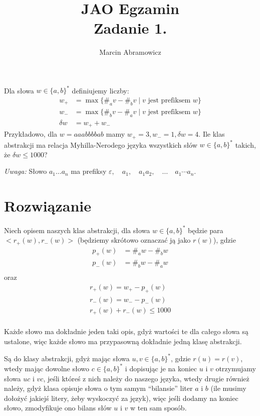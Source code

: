 \documentclass[a4paper]{article}
\title{JAO Egzamin\\ Zadanie 1.}
\author{Marcin Abramowicz}
\newcommand{\eps}{\varepsilon}%
\newcommand{\set}[1]{\{#1\}}%
\begin{document}
\maketitle

Dla słowa $w\in \set{a,b}^*$ definiujemy liczby:
\begin{align*}
    w_+&=\max \set{\#_av-\#_bv\mid v \text{ jest prefiksem }w}\\
    w_-&=\max \set{\#_bv-\#_av\mid v \text{ jest prefiksem }w}\\
    \delta w&=w_++w_-
\end{align*}
Przykładowo, dla $w=aaabbbbab$
mamy $w_+=3, w_-=1, \delta w=4$.
Ile klas abstrakcji ma relacja Myhilla-Nerodego języka wszystkich słów $w\in\set{a,b}^*$ takich, że $\delta w\leq 1000$?

\medskip\noindent
\emph{Uwaga:} Słowo $a_1\ldots a_n$ ma prefiksy $\eps,\quad a_1,\quad a_1a_2,\quad\ldots\quad a_1\cdots a_n$.


\section*{Rozwiązanie}
Niech opisem naszych klas abstrakcji, dla słowa $w \in \set{a, b}^*$ będzie para $<r_+(w), r_-(w)>$ (będziemy skrótowo oznaczać ją jako $r(w)$), gdzie 
\begin{align*}
    p_+(w)&=\#_aw-\#_bw \\
    p_-(w)&=\#_bw-\#_aw \\
\end{align*} 
oraz
\begin{align*}
   r_+(w)= w_+-p_+(w) \\
   r_-(w)=w_--p_-(w) \\
   r_+(w) + r_-(w) \leq 1000 \\
\end{align*} 

Każde słowo ma dokładnie jeden taki opis, gdyż wartości te dla całego słowa są ustalone, więc każde słowo ma przypasowną dokładnie jedną klasę abstrakcji.

Są do klasy abstrakcji, gdyż mając słowa $u, v \in \set{a,b}^*$, gdzie $r(u) = r(v)$, wtedy mając dowolne słowo $c \in \set{a,b}^*$ i dopisując je na koniec $u$ i $v$ otrzymujamy słowa $uc$ i $vc$, jeśli któreś z nich należy do naszego języka, wtedy drugie również należy, gdyż klasa opisuje słowa o tym samym ``bilansie'' liter $a$ i $b$ (ile musimy dołożyć jakiejś litery, żeby wyskoczyć za język), więc jeśli dodamy na koniec słowo, zmodyfikuje ono bilans słów $u$ i $v$ w ten sam sposób.
\end{document}
